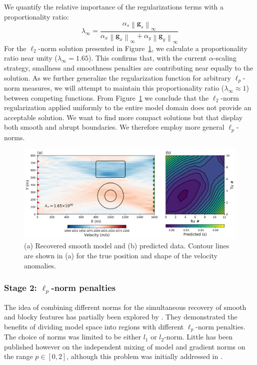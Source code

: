 \documentclass[extra,referee]{gji}
\begin{document}
We quantify the relative importance of the regularizations terms with a proportionality ratio:
\begin{equation}\label{derivRatio}
\lambda_\infty = \frac{ \alpha_s \left\|\mathbf{g}_s \right\|_\infty}{\alpha_x \left\| \mathbf{g}_x \right\|_\infty + \alpha_y \left\| \mathbf{g}_y \right\|_\infty}
\end{equation}
For the $\ell_2$-norm solution presented in Figure~\ref{Problem2D_l2norm}, we calculate a proportionality ratio near unity ($\lambda_\infty = 1.65$). This confirms that, with the current $\alpha$-scaling strategy, smallness and smoothness penalties are contributing near equally to the solution.
As we further generalize the regularization function for arbitrary $\ell_p$-norm measures, we will attempt to maintain this proportionality ratio ($\lambda_\infty \approx 1$) between competing functions.
From Figure~\ref{Problem2D_l2norm} we conclude that the $\ell_2$-norm regularization applied uniformly to the entire model domain does not provide an acceptable solution. We want to find more compact solutions but that display both smooth and abrupt boundaries. We therefore employ more general $\ell_p$-norms.

\begin{figure}
\includegraphics[width=\columnwidth]{Figures/Problem2D_l2Solution.png}
\caption{(a) Recovered smooth model and (b) predicted data. Contour lines are shown in (a) for the true position and shape of the velocity anomalies.
}
\label{Problem2D_l2norm}
\end{figure}


\subsubsection{Stage 2: $\ell_p$-norm penalties}

The idea of combining different norms for the simultaneous recovery of smooth and blocky features has partially been explored by \citet{SunLi14}. They demonstrated the benefits of dividing model space into regions with different $\ell_p$-norm penalties. The choice of norms was limited to be either $l_1$ or $l_2$-norm.
Little has been published however on the independent mixing of model and gradient norms on the range $p \in [0,2]$, although this problem was initially addressed in \cite[]{Fournier2015}.
\end{document}
